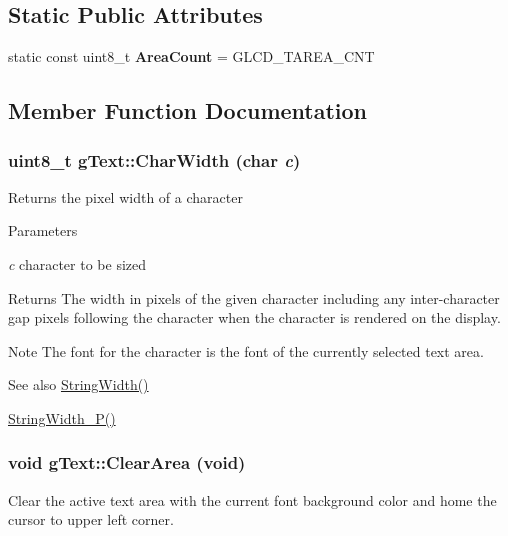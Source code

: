 \subsection*{Static Public Attributes}
\begin{DoxyCompactItemize}
\item 
\hypertarget{classg_text_a4b49a135fda410b98469a0a8c9d8fd25}{
static const uint8\_\-t {\bfseries AreaCount} = GLCD\_\-TAREA\_\-CNT}
\label{classg_text_a4b49a135fda410b98469a0a8c9d8fd25}

\end{DoxyCompactItemize}


\subsection{Member Function Documentation}
\hypertarget{classg_text_a6cb49e22a690752ea439e2773ae31ec1}{
\subsubsection[{CharWidth}]{\setlength{\rightskip}{0pt plus 5cm}uint8\_\-t gText::CharWidth (char {\em c})}}
\label{classg_text_a6cb49e22a690752ea439e2773ae31ec1}
Returns the pixel width of a character


\begin{DoxyParams}{Parameters}
\item[{\em c}]character to be sized\end{DoxyParams}
\begin{DoxyReturn}{Returns}
The width in pixels of the given character including any inter-\/character gap pixels following the character when the character is rendered on the display.
\end{DoxyReturn}
\begin{DoxyNote}{Note}
The font for the character is the font of the currently selected text area.
\end{DoxyNote}
\begin{DoxySeeAlso}{See also}
\hyperlink{classg_text_a0dce9ad4c40e0d8b0487f4d2303bd8ef}{StringWidth()} 

\hyperlink{classg_text_ae6f8d92ff8240dee9e32f74b1cbff44a}{StringWidth\_\-P()} 
\end{DoxySeeAlso}
\hypertarget{classg_text_a8918c2e7b5b1121a6c9051db049c85bf}{
\subsubsection[{ClearArea}]{\setlength{\rightskip}{0pt plus 5cm}void gText::ClearArea (void)}}
\label{classg_text_a8918c2e7b5b1121a6c9051db049c85bf}
Clear the active text area with the current font background color and home the cursor to upper left corner.

